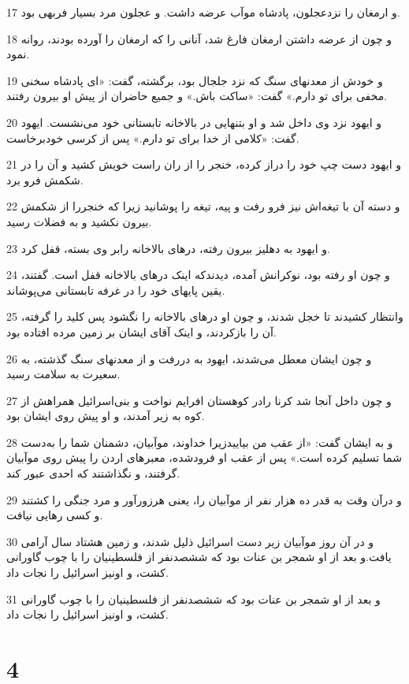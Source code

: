 \par 17 و ارمغان را نزدعجلون، پادشاه موآب عرضه داشت. و عجلون مرد بسیار فربهی بود.
\par 18 و چون از عرضه داشتن ارمغان فارغ شد، آنانی را که ارمغان را آورده بودند، روانه نمود.
\par 19 و خودش از معدنهای سنگ که نزد جلجال بود، برگشته، گفت: «ای پادشاه سخنی مخفی برای تو دارم.» گفت: «ساکت باش.» و جمیع حاضران از پیش او بیرون رفتند.
\par 20 و ایهود نزد وی داخل شد و او بتنهایی در بالاخانه تابستانی خود می‌نشست. ایهود گفت: «کلامی از خدا برای تو دارم.» پس از کرسی خودبرخاست. 
\par 21 و ایهود دست چپ خود را دراز کرده، خنجر را از ران راست خویش کشید و آن را در شکمش فرو برد.
\par 22 و دسته آن با تیغه‌اش نیز فرو رفت و پیه، تیغه را پوشانید زیرا که خنجررا از شکمش بیرون نکشید و به فضلات رسید.
\par 23 و ایهود به دهلیز بیرون رفته، درهای بالاخانه رابر وی بسته، قفل کرد.
\par 24 و چون او رفته بود، نوکرانش آمده، دیدندکه اینک درهای بالاخانه قفل است. گفتند، یقین پایهای خود را در غرفه تابستانی می‌پوشاند.
\par 25 وانتظار کشیدند تا خجل شدند، و چون او درهای بالاخانه را نگشود پس کلید را گرفته، آن را بازکردند، و اینک آقای ایشان بر زمین مرده افتاده بود.
\par 26 و چون ایشان معطل می‌شدند، ایهود به دررفت و از معدنهای سنگ گذشته، به سعیرت به سلامت رسید.
\par 27 و چون داخل آنجا شد کرنا رادر کوهستان افرایم نواخت و بنی‌اسرائیل همراهش از کوه به زیر آمدند، و او پیش روی ایشان بود.
\par 28 و به ایشان گفت: «از عقب من بیاییدزیرا خداوند، موآبیان، دشمنان شما را به‌دست شما تسلیم کرده است.» پس از عقب او فرودشده، معبرهای اردن را پیش روی موآبیان گرفتند، و نگذاشتند که احدی عبور کند.
\par 29 و درآن وقت به قدر ده هزار نفر از موآبیان را، یعنی هرزورآور و مرد جنگی را کشتند و کسی رهایی نیافت.
\par 30 و در آن روز موآبیان زیر دست اسرائیل ذلیل شدند، و زمین هشتاد سال آرامی یافت.و بعد از او شمجر بن عنات بود که ششصدنفر از فلسطینیان را با چوب گاورانی کشت، و اونیز اسرائیل را نجات داد.
\par 31 و بعد از او شمجر بن عنات بود که ششصدنفر از فلسطینیان را با چوب گاورانی کشت، و اونیز اسرائیل را نجات داد.
 
\chapter{4}

